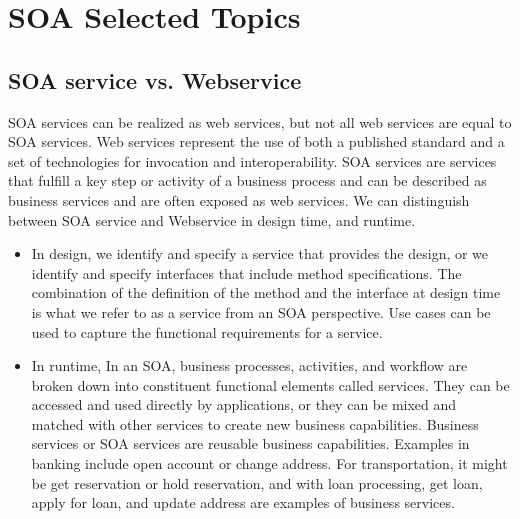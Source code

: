\documentclass[12pt,a4paper,final,twoside,onecolumn,titlepage]{book}
\begin{document}
\section{SOA Selected Topics}
\subsection{SOA service vs. Webservice}
\gls{SOA} services can be realized as web services, but not all web services are equal to \gls{SOA} services. Web services represent the use of both a published standard and a set of technologies for invocation and interoperability. \gls{SOA} services are services that fulfill a key step or activity of a business process and can be described as business services and are often exposed as web services.
We can distinguish between \gls{SOA} service and Webservice in design time, and runtime.
\begin{itemize}
\item In design, we identify and specify a service that provides the design, or we identify and specify interfaces that include method specifications. The combination of the definition of the method and the interface at design time is what we refer to as a service from an \gls{SOA} perspective. Use cases can be used to capture the functional requirements for a service.
\item In runtime, In an \gls{SOA}, business processes, activities, and workflow are broken down into constituent functional elements called services. They can be accessed and used directly by applications, or they can be mixed and matched with other services to create new business capabilities. Business services or \gls{SOA} services are reusable business capabilities. Examples in banking include open account or change address. For transportation, it might be get reservation or hold reservation, and with loan processing, get loan, apply for loan, and update address are examples of business services.
\end{itemize}
\end{document}
